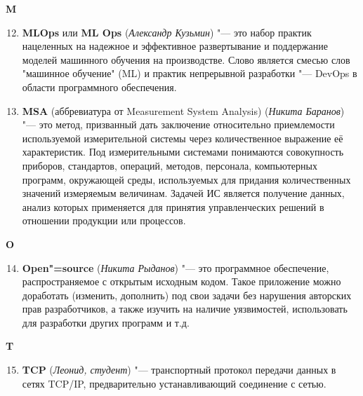 \begin{flushleft} \large\textbf{M} \end{flushleft}
\begin{enumerate}
    \setcounter{enumi}{11}
    
    \item \textbf{MLOps} или \textbf{ML Ops} (\textit{Александр Кузьмин}) "--- 
    это набор практик нацеленных на надежное и эффективное развертывание и поддержание моделей машинного обучения на производстве. Слово является смесью слов "машинное обучение" (ML) и практик непрерывной разработки "--- DevOps в области программного обеспечения.

    \item \textbf{MSA}  (аббревиатура от Measurement System Analysis) (\textit{Никита Баранов}) "---
     это метод, призванный дать заключение относительно приемлемости используемой измерительной системы через количественное выражение её характеристик. Под измерительными системами понимаются совокупность приборов, стандартов, операций, методов, персонала, компьютерных программ, окружающей среды, используемых для придания количественных значений измеряемым величинам. Задачей ИС является получение данных, анализ которых применяется для принятия управленческих решений в отношении продукции или процессов.
    
\end{enumerate}

\begin{flushleft} \large\textbf{O} \end{flushleft}

\begin{enumerate}
    \setcounter{enumi}{13}
    
    \item \textbf{Open"=source} (\textit{Никита Рыданов}) "--- это программное обеспечение, распространяемое с открытым исходным кодом. Такое приложение можно доработать (изменить, дополнить) под свои задачи без нарушения авторских прав разработчиков, а также изучить на наличие уязвимостей, использовать для разработки других программ и т.д.
    
\end{enumerate}

\begin{flushleft} \large\textbf{T} \end{flushleft}

\begin{enumerate}
\setcounter{enumi}{14}
 
     \item \textbf{TCP} (\textit{Леонид, студент}) "--- 
      транспортный протокол передачи данных в сетях TCP/IP, предварительно устанавливающий соединение с сетью.
     
\end{enumerate}

